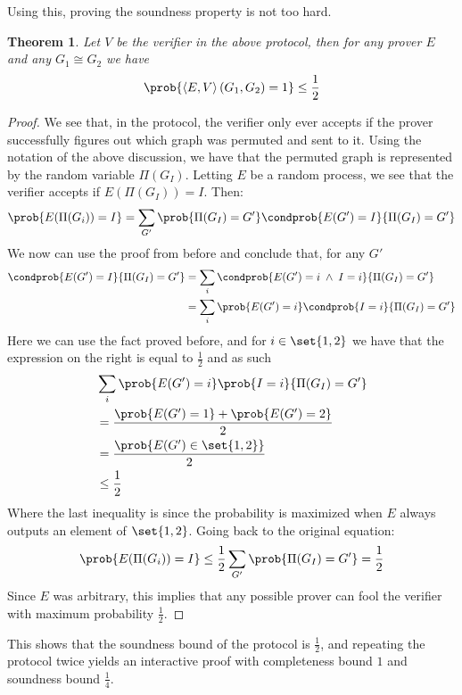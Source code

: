 \documentclass{article}
\newtheorem{theorem}{Theorem}
\begin{document}
Using this, proving the soundness property is not too hard.
\begin{theorem}
    Let $V$ be the verifier in the above protocol, then for any  prover $E$ and any $G_1  \cong G_2$ we have \[ \prob{\left<E, V\right>(G_1, G_2) = 1} \leq \frac{1}{2} \]
\end{theorem}
\begin{proof}
    We see that, in the protocol, the verifier only ever accepts if the prover successfully figures out which graph was permuted and sent to it. Using the notation of the above discussion, we have that the permuted graph is represented by the random variable $\Pi(G_I)$. Letting $E$ be a random process, we see that the verifier accepts if $E(\Pi(G_I)) = I$. Then:
    \[ \prob{E(\Pi(G_i)) = I} = \sum_{G'} \prob{\Pi(G_I) = G'} \condprob{E(G') = I}{\Pi(G_I) = G'} \]
    We now can use the proof from before and conclude that, for any $G'$
    \begin{align*}
        \condprob{E(G') = I}{\Pi(G_I) = G'} & = \sum_i \condprob{E(G') = i \; \land \; I = i}{\Pi(G_I) = G'} \\
                                            & = \sum_i \prob{E(G') = i } \condprob{ I = i}{\Pi(G_I) = G'}
    \end{align*}
    Here we can use the fact proved before, and for $i \in \set{1, 2}$ we have that the expression on the right is equal to $\frac{1}{2}$ and as such
    \begin{align*}
         & \sum_i \prob{E(G') = i } \prob{ I = i}{\Pi(G_I) = G' } \\
         & = \frac{\prob{E(G') = 1 } + \prob{E(G') = 2}}{2}       \\
         & = \frac{\prob{E(G') \in \set{ 1, 2}}}{2}               \\
         & \leq \frac{1}{2}
    \end{align*}
    Where the last inequality is since the probability is maximized when $E$ always outputs an element of $ \set{ 1, 2}$. Going back to the original equation:
    \[\prob{E(\Pi(G_i)) = I} \leq \frac{1}{2} \sum_{G'} \prob{\Pi(G_I) = G'} = \frac{1}{2} \]
    Since $E$ was arbitrary, this implies that any possible prover can fool the verifier with maximum probability $\frac{1}{2}$.
\end{proof}

This shows that the soundness bound of the protocol is $\frac{1}{2}$, and repeating the protocol twice yields an interactive proof with completeness bound $1$ and soundness bound $\frac{1}{4}$.
\end{document}

